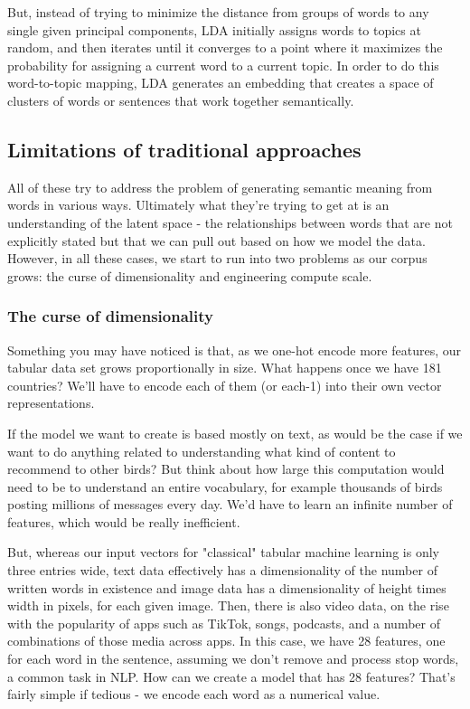 \documentclass[draft, 11pt]{diazessay} %
\begin{document}
But, instead of trying to minimize the distance from groups of words to any single given principal components, LDA initially assigns words to topics at random, and then iterates until it converges to a point where it maximizes the probability for assigning a current word to a current topic.  In order to do this word-to-topic mapping, LDA generates an embedding that creates a space of clusters of words or sentences that work together semantically. 

\subsection{Limitations of traditional approaches}
 
 All of these try to address the problem of generating semantic meaning from words in various ways. Ultimately what they're trying to get at is an understanding of the latent space - the relationships between words that are not explicitly stated but that we can pull out based on how we model the data. However, in all these cases, we start to run into two problems as our corpus grows: the curse of dimensionality and engineering compute scale. 
 
 \subsubsection{The curse of dimensionality}

Something you may have noticed is that, as we one-hot encode more features, our tabular data set grows proportionally in size. What happens once we have 181 countries? We'll have to encode each of them (or each-1) into their own vector representations.

If the model we want to create is based mostly on text, as would be the case if we want to do anything related to understanding what kind of content to recommend to other birds? But think about how large this computation would need to be to understand an entire vocabulary, for example thousands of birds posting millions of messages every day. We'd have to learn an infinite number of features, which would be really inefficient.

But, whereas our input vectors for "classical" tabular machine learning is only three entries wide, text data effectively has a dimensionality of the number of written words in existence and image data has a dimensionality of height times width in pixels, for each given image. Then, there is also video data, on the rise with the popularity of apps such as TikTok, songs, podcasts, and a number of combinations of those media across apps.  In this case, we have 28 features, one for each word in the sentence, assuming we don't remove and process stop words, a common task in NLP.  How can we create a model that has 28 features? That's fairly simple if tedious - we encode each word as a numerical value. 
\end{document}
